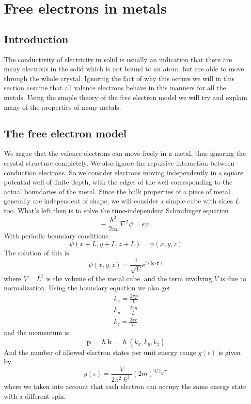 \documentclass[11pt]{article}
\begin{document}
\section{Free electrons in metals}
\subsection{Introduction}
The conductivity of electricity in solid is usually an indication that there are many electrons in the solid which is not bound to an atom, but are able to move through the whole crystal. Ignoring the fact of why this occurs we will in this section assume that all valence electrons behave in this manners for all the metals. Using the simple theory of the free electron model we will try and explain many of the properties of many metals.
\subsection{The free electron model}
We argue that the valence electrons can move freely in a metal, thus ignoring the crystal structure completely. We also ignore the repulsive interaction between conduction electrons. So we consider electrons moving independently in a square potential well of finite depth, with the edges of the well corresponding to the actual boundaries of the metal. Since the bulk properties of a piece of metal generally are independent of shape, we will consider a simple cube with sides $L$ too. What's left then is to solve the time-independent Schrödinger equation
\begin{equation}
	- \frac{\hslash^2}{2m} \nabla^2 \psi = \epsilon \psi.
\end{equation}
With periodic boundary conditions
\begin{equation}
	\psi (x+L, y+L, z+L) = \psi(x,y,z)
\end{equation}
The solution of this is
\begin{equation}
	\psi(x,y,z) = \frac{1}{\sqrt{V}} e^{i(\pmb{k}\cdot\pmb{r})}
\end{equation}
where $V = L^3$ is the volume of the metal cube, and the term involving $V$ is due to normalization. Using the boundary equation we also get
\begin{align}
	k_x = \frac{2\pi p}{L} \\
	k_y = \frac{2\pi q}{L} \\
	k_z = \frac{2\pi r}{L} 
\end{align}
and the momentum is
\begin{equation}
	\pmb{p} = \hslash\pmb{k} = \hslash(k_x, k_y,k_z)
	\label{eq:wavefunction-free-electron-gas}
\end{equation}
And the number of allowed electron states per unit energy range $g(\epsilon)$ is given by
\begin{equation}
	g(\epsilon) = \frac{V}{2\pi^2 \hslash^3} (2m)^{3/2 \sqrt{\epsilon}}
\end{equation}
where we taken into account that each electron can occupy the same energy state with a different spin.
\end{document}
